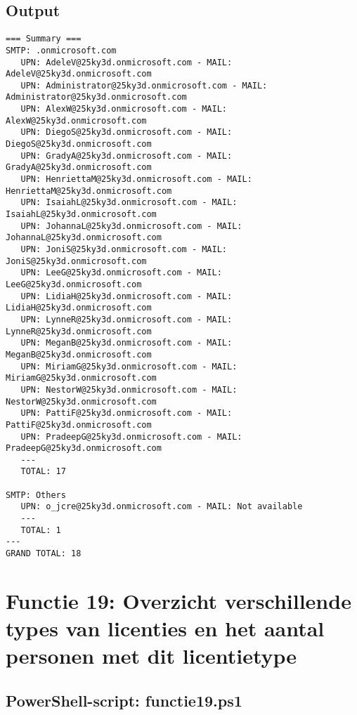 \clearpage

\subsection{Output}

\begin{scriptsize}
    \begin{verbatim}
=== Summary ===
SMTP: .onmicrosoft.com
   UPN: AdeleV@25ky3d.onmicrosoft.com - MAIL: AdeleV@25ky3d.onmicrosoft.com
   UPN: Administrator@25ky3d.onmicrosoft.com - MAIL: Administrator@25ky3d.onmicrosoft.com
   UPN: AlexW@25ky3d.onmicrosoft.com - MAIL: AlexW@25ky3d.onmicrosoft.com
   UPN: DiegoS@25ky3d.onmicrosoft.com - MAIL: DiegoS@25ky3d.onmicrosoft.com
   UPN: GradyA@25ky3d.onmicrosoft.com - MAIL: GradyA@25ky3d.onmicrosoft.com
   UPN: HenriettaM@25ky3d.onmicrosoft.com - MAIL: HenriettaM@25ky3d.onmicrosoft.com
   UPN: IsaiahL@25ky3d.onmicrosoft.com - MAIL: IsaiahL@25ky3d.onmicrosoft.com
   UPN: JohannaL@25ky3d.onmicrosoft.com - MAIL: JohannaL@25ky3d.onmicrosoft.com
   UPN: JoniS@25ky3d.onmicrosoft.com - MAIL: JoniS@25ky3d.onmicrosoft.com
   UPN: LeeG@25ky3d.onmicrosoft.com - MAIL: LeeG@25ky3d.onmicrosoft.com
   UPN: LidiaH@25ky3d.onmicrosoft.com - MAIL: LidiaH@25ky3d.onmicrosoft.com
   UPN: LynneR@25ky3d.onmicrosoft.com - MAIL: LynneR@25ky3d.onmicrosoft.com
   UPN: MeganB@25ky3d.onmicrosoft.com - MAIL: MeganB@25ky3d.onmicrosoft.com
   UPN: MiriamG@25ky3d.onmicrosoft.com - MAIL: MiriamG@25ky3d.onmicrosoft.com
   UPN: NestorW@25ky3d.onmicrosoft.com - MAIL: NestorW@25ky3d.onmicrosoft.com
   UPN: PattiF@25ky3d.onmicrosoft.com - MAIL: PattiF@25ky3d.onmicrosoft.com
   UPN: PradeepG@25ky3d.onmicrosoft.com - MAIL: PradeepG@25ky3d.onmicrosoft.com
   ---
   TOTAL: 17

SMTP: Others
   UPN: o_jcre@25ky3d.onmicrosoft.com - MAIL: Not available
   ---
   TOTAL: 1
---
GRAND TOTAL: 18
    \end{verbatim}
\end{scriptsize}

\clearpage

\section{Functie 19: Overzicht verschillende types van licenties en het aantal personen met dit licentietype}

\subsection{PowerShell-script: functie19.ps1}


